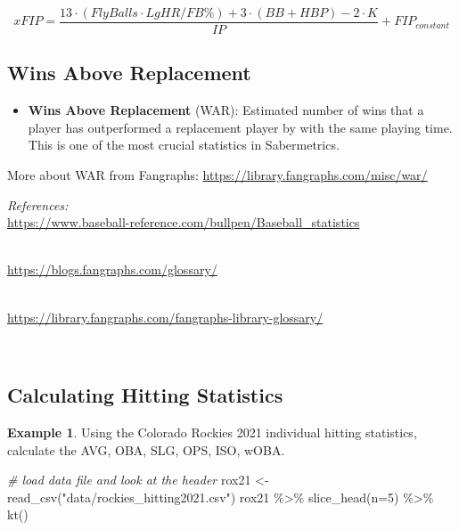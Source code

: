 \documentclass[
  11pt,
]{book}
\newenvironment{Shaded}{\begin{snugshade}}{\end{snugshade}}
\newcommand{\AttributeTok}[1]{\textcolor[rgb]{0.77,0.63,0.00}{#1}}
\newcommand{\CommentTok}[1]{\textcolor[rgb]{0.56,0.35,0.01}{\textit{#1}}}
\newcommand{\DecValTok}[1]{\textcolor[rgb]{0.00,0.00,0.81}{#1}}
\newcommand{\FunctionTok}[1]{\textcolor[rgb]{0.00,0.00,0.00}{#1}}
\newcommand{\NormalTok}[1]{#1}
\newcommand{\OtherTok}[1]{\textcolor[rgb]{0.56,0.35,0.01}{#1}}
\newcommand{\SpecialCharTok}[1]{\textcolor[rgb]{0.00,0.00,0.00}{#1}}
\newcommand{\StringTok}[1]{\textcolor[rgb]{0.31,0.60,0.02}{#1}}
\providecommand{\tightlist}{%
  \setlength{\itemsep}{0pt}\setlength{\parskip}{0pt}}
\theoremstyle{definition}
\theoremstyle{definition}
\newtheorem{example}{Example}[chapter]
\theoremstyle{definition}
\theoremstyle{definition}
\theoremstyle{remark}
\begin{document}
\[xFIP = \frac{13 \cdot (Fly Balls \cdot LgHR/FB\%)+3 \cdot (BB + HBP) - 2 \cdot K}{IP} + FIP_{constant}\]

\hypertarget{wins-above-replacement}{%
\subsection{Wins Above Replacement}\label{wins-above-replacement}}

\begin{itemize}
\tightlist
\item
  \textbf{Wins Above Replacement} (WAR): Estimated number of wins that a player has outperformed a replacement player by with the same playing time. This is one of the most crucial statistics in Sabermetrics.
\end{itemize}

More about WAR from Fangraphs: \url{https://library.fangraphs.com/misc/war/}

\emph{References:}\\
\url{https://www.baseball-reference.com/bullpen/Baseball_statistics}\strut \\
\url{https://blogs.fangraphs.com/glossary/}\strut \\
\url{https://library.fangraphs.com/fangraphs-library-glossary/}\strut \\

\newpage

\hypertarget{calculating-hitting-statistics}{%
\subsection{Calculating Hitting Statistics}\label{calculating-hitting-statistics}}

\begin{example}
Using the Colorado Rockies 2021 individual hitting statistics, calculate the AVG, OBA, SLG, OPS, ISO, wOBA.
\end{example}

\begin{Shaded}
\begin{Highlighting}[]
\CommentTok{\# load data file and look at the header}
\NormalTok{rox21 }\OtherTok{\textless{}{-}} \FunctionTok{read\_csv}\NormalTok{(}\StringTok{"data/rockies\_hitting2021.csv"}\NormalTok{)}
\NormalTok{rox21 }\SpecialCharTok{\%\textgreater{}\%} \FunctionTok{slice\_head}\NormalTok{(}\AttributeTok{n=}\DecValTok{5}\NormalTok{) }\SpecialCharTok{\%\textgreater{}\%} \FunctionTok{kt}\NormalTok{()}
\end{Highlighting}
\end{Shaded}
\end{document}
